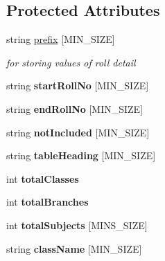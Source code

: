 \subsection*{Protected Attributes}
\begin{DoxyCompactItemize}
\item 
string \hyperlink{classRollNoDetail_af6210eb33a46b384c832560c9f1ebf07}{prefix} \mbox{[}M\-I\-N\-\_\-\-S\-I\-Z\-E\mbox{]}
\begin{DoxyCompactList}\small\item\em for storing values of roll detail \end{DoxyCompactList}\item 
\hypertarget{classRollNoDetail_ad093a47700148161f6bb299699ed8ff1}{string {\bfseries start\-Roll\-No} \mbox{[}M\-I\-N\-\_\-\-S\-I\-Z\-E\mbox{]}}\label{classRollNoDetail_ad093a47700148161f6bb299699ed8ff1}

\item 
\hypertarget{classRollNoDetail_a4eb0c44518937595bd377d40292422f9}{string {\bfseries end\-Roll\-No} \mbox{[}M\-I\-N\-\_\-\-S\-I\-Z\-E\mbox{]}}\label{classRollNoDetail_a4eb0c44518937595bd377d40292422f9}

\item 
\hypertarget{classRollNoDetail_aad7c0a0f7d5e854737a5fecfb4b745ca}{string {\bfseries not\-Included} \mbox{[}M\-I\-N\-\_\-\-S\-I\-Z\-E\mbox{]}}\label{classRollNoDetail_aad7c0a0f7d5e854737a5fecfb4b745ca}

\item 
\hypertarget{classRollNoDetail_aae069ca2353fe637315bdeed03a79f41}{string {\bfseries table\-Heading} \mbox{[}M\-I\-N\-\_\-\-S\-I\-Z\-E\mbox{]}}\label{classRollNoDetail_aae069ca2353fe637315bdeed03a79f41}

\item 
\hypertarget{classRollNoDetail_ad904c7f4cf276df50d76651b5c4255c7}{int {\bfseries total\-Classes}}\label{classRollNoDetail_ad904c7f4cf276df50d76651b5c4255c7}

\item 
\hypertarget{classRollNoDetail_ad878491f4833cdc1a09619f8054cdc69}{int {\bfseries total\-Branches}}\label{classRollNoDetail_ad878491f4833cdc1a09619f8054cdc69}

\item 
\hypertarget{classRollNoDetail_a6576733c537190705ed7dd52a030bda0}{int {\bfseries total\-Subjects} \mbox{[}M\-I\-N\-S\-\_\-\-S\-I\-Z\-E\mbox{]}}\label{classRollNoDetail_a6576733c537190705ed7dd52a030bda0}

\item 
\hypertarget{classRollNoDetail_a22983fab33abb636b6c9ec2fad0a1681}{string {\bfseries class\-Name} \mbox{[}M\-I\-N\-\_\-\-S\-I\-Z\-E\mbox{]}}\label{classRollNoDetail_a22983fab33abb636b6c9ec2fad0a1681}


\end{DoxyCompactItemize}
